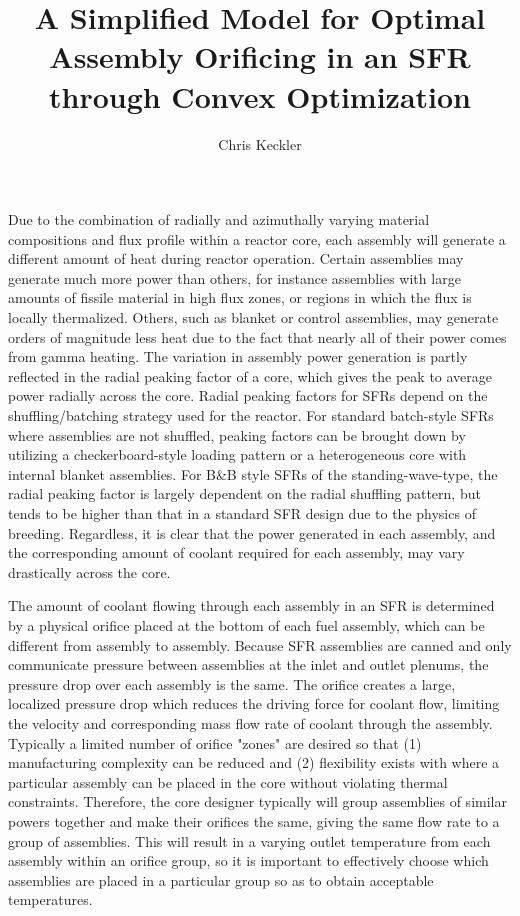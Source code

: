 \documentclass[11pt, oneside]{article}   	%
\title{A Simplified Model for Optimal Assembly Orificing in an SFR through Convex Optimization}
\author{Chris Keckler}
\begin{document}
\maketitle

Due to the combination of radially and azimuthally varying material compositions and flux profile within a reactor core, each assembly will generate a different amount of heat during reactor operation.
Certain assemblies may generate much more power than others, for instance assemblies with large amounts of fissile material in high flux zones, or regions in which the flux is locally thermalized.
Others, such as blanket or control assemblies, may generate orders of magnitude less heat due to the fact that nearly all of their power comes from gamma heating.
The variation in assembly power generation is partly reflected in the radial peaking factor of a core, which gives the peak to average power radially across the core. 
Radial peaking factors for SFRs depend on the shuffling/batching strategy used for the reactor.
For standard batch-style SFRs where assemblies are not shuffled, peaking factors can be brought down by utilizing a checkerboard-style loading pattern or a heterogeneous core with internal blanket assemblies. 
For B\&B style SFRs of the standing-wave-type, the radial peaking factor is largely dependent on the radial shuffling pattern, but tends to be higher than that in a standard SFR design due to the physics of breeding.
Regardless, it is clear that the power generated in each assembly, and the corresponding amount of coolant required for each assembly, may vary drastically across the core.

The amount of coolant flowing through each assembly in an SFR is determined by a physical orifice placed at the bottom of each fuel assembly, which can be different from assembly to assembly.
Because SFR assemblies are canned and only communicate pressure between assemblies at the inlet and outlet plenums, the pressure drop over each assembly is the same.
The orifice creates a large, localized pressure drop which reduces the driving force for coolant flow, limiting the velocity and corresponding mass flow rate of coolant through the assembly.
Typically a limited number of orifice "zones" are desired so that (1) manufacturing complexity can be reduced and (2) flexibility exists with where a particular assembly can be placed in the core without violating thermal constraints.
Therefore, the core designer typically will group assemblies of similar powers together and make their orifices the same, giving the same flow rate to a group of assemblies.
This will result in a varying outlet temperature from each assembly within an orifice group, so it is important to effectively choose which assemblies are placed in a particular group so as to obtain acceptable temperatures.
\end{document}
